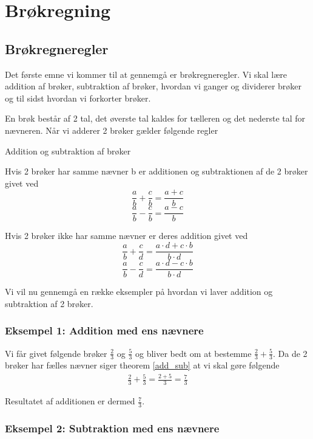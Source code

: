 \section{Brøkregning}

\subsection{Brøkregneregler}

Det første emne vi kommer til at gennemgå er brøkregneregler. Vi skal lære addition af brøker, subtraktion af brøker, hvordan vi ganger og dividerer brøker og til sidst hvordan vi forkorter brøker. 

En brøk består af 2 tal, det øverste tal kaldes for tælleren og det nederste tal for nævneren. Når vi adderer 2 brøker gælder følgende regler

\begin{frm-thm}{Addition og subtraktion af brøker}


Hvis 2 brøker har samme nævner b er additionen og subtraktionen af de 2 brøker givet ved
\[ \frac{a}{b} + \frac{c}{b} = \frac{a + c}{b}   \]
\[\frac{a}{b} - \frac{c}{b} = \frac{a - c}{b}\]

Hvis 2 brøker ikke har samme nævner er deres addition givet ved
\[ \frac{a}{b} + \frac{c}{d} = \frac{a\cdot d + c \cdot b}{b \cdot d} \]
\[\frac{a}{b} - \frac{c}{d} = \frac{a\cdot d - c\cdot b}{b \cdot d} \]
\end{frm-thm}

Vi vil nu gennemgå en række eksempler på hvordan vi laver addition og subtraktion af 2 brøker.

\subsubsection*{Eksempel 1: Addition med ens nævnere}

Vi får givet følgende brøker $\frac{2}{3}$ og $\frac{5}{3}$ og bliver bedt om at bestemme $\frac{2}{3} + \frac{5}{3}$. Da de 2 brøker har fælles nævner siger theorem \ref{add_sub} at vi skal gøre følgende
\begin{align*}
\frac{2}{3} + \frac{5}{3} = \frac{2 + 5}{3} = \frac{7}{3}
\end{align*}

Resultatet af additionen er dermed $\frac{7}{3}$.

\subsubsection*{Eksempel 2: Subtraktion med ens nævnere}

